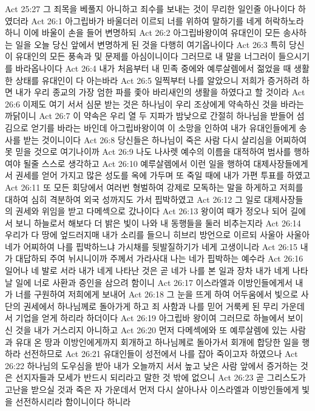 Act 25:27  그 죄목을 베풀지 아니하고 죄수를 보내는 것이 무리한 일인줄 아나이다 하였더라
Act 26:1  아그립바가 바울더러 이르되 너를 위하여 말하기를 네게 허락하노라 하니 이에 바울이 손을 들어 변명하되
Act 26:2  아그립바왕이여 유대인이 모든 송사하는 일을 오늘 당신 앞에서 변명하게 된 것을 다행히 여기옵나이다
Act 26:3  특히 당신이 유대인의 모든 풍속과 및 문제를 아심이니이다 그러므로 내 말을 너그러이 들으시기를 바라옵나이다
Act 26:4  내가 처음부터 내 민족 중에와 예루살렘에서 젊었을 때 생활한 상태를 유대인이 다 아는바라
Act 26:5  일찍부터 나를 알았으니 저희가 증거하려 하면 내가 우리 종교의 가장 엄한 파를 좇아 바리새인의 생활을 하였다고 할 것이라
Act 26:6  이제도 여기 서서 심문 받는 것은 하나님이 우리 조상에게 약속하신 것을 바라는 까닭이니
Act 26:7  이 약속은 우리 열 두 지파가 밤낮으로 간절히 하나님을 받들어 섬김으로 얻기를 바라는 바인데 아그립바왕이여 이 소망을 인하여 내가 유대인들에게 송사를 받는 것이니이다
Act 26:8  당신들은 하나님이 죽은 사람 다시 살리심을 어찌하여 못 믿을 것으로 여기나이까
Act 26:9  나도 나사렛 예수의 이름을 대적하여 범사를 행하여야 될줄 스스로 생각하고
Act 26:10  예루살렘에서 이런 일을 행하여 대제사장들에게서 권세를 얻어 가지고 많은 성도를 옥에 가두며 또 죽일 때에 내가 가편 투표를 하였고
Act 26:11  또 모든 회당에서 여러번 형벌하여 강제로 모독하는 말을 하게하고 저희를 대하여 심히 격분하여 외국 성까지도 가서 핍박하였고
Act 26:12  그 일로 대제사장들의 권세와 위임을 받고 다메섹으로 갔나이다
Act 26:13  왕이여 때가 정오나 되어 길에서 보니 하늘로서 해보다 더 밝은 빛이 나와 내 동행들을 둘러 비추는지라
Act 26:14  우리가 다 땅에 엎드러지매 내가 소리를 들으니 히브리 방언으로 이르되 사울아 사울아 네가 어찌하여 나를 핍박하느냐 가시채를 뒷발질하기가 네게 고생이니라
Act 26:15  내가 대답하되 주여 뉘시니이까 주께서 가라사대 나는 네가 핍박하는 예수라
Act 26:16  일어나 네 발로 서라 내가 네게 나타난 것은 곧 네가 나를 본 일과 장차 내가 네게 나타날 일에 너로 사환과 증인을 삼으려 함이니
Act 26:17  이스라엘과 이방인들에게서 내가 너를 구원하여 저희에게 보내어
Act 26:18  그 눈을 뜨게 하여 어두움에서 빛으로 사단의 권세에서 하나님께로 돌아가게 하고 죄 사함과 나를 믿어 거룩케 된 무리 가운데서 기업을 얻게 하리라 하더이다
Act 26:19  아그립바 왕이여 그러므로 하늘에서 보이신 것을 내가 거스리지 아니하고
Act 26:20  먼저 다메섹에와 또 예루살렘에 있는 사람과 유대 온 땅과 이방인에게까지 회개하고 하나님께로 돌아가서 회개에 합당한 일을 행하라 선전하므로
Act 26:21  유대인들이 성전에서 나를 잡아 죽이고자 하였으나
Act 26:22  하나님의 도우심을 받아 내가 오늘까지 서서 높고 낮은 사람 앞에서 증거하는 것은 선지자들과 모세가 반드시 되리라고 말한 것 밖에 없으니
Act 26:23  곧 그리스도가 고난을 받으실 것과 죽은 자 가운데서 먼저 다시 살아나사 이스라엘과 이방인들에게 빛을 선전하시리라 함이니이다 하니라
